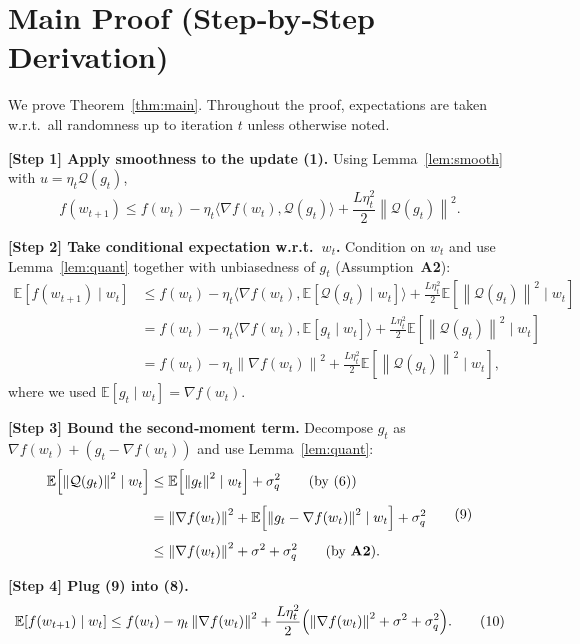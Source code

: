 \documentclass{article}
\newcommand{\E}{\mathbb{E}}
\newcommand{\norm}[1]{\left\lVert #1\right\rVert}
\newcommand{\Qop}{\mathcal{Q}}
\begin{document}
\section*{Main Proof (Step‑by‑Step Derivation)}
We prove Theorem~\ref{thm:main}.  Throughout the proof, expectations are taken w.r.t.\ all randomness up to iteration $t$ unless otherwise noted.

\bigskip
\noindent\textbf{[Step 1] Apply smoothness to the update (1).}  
Using Lemma~\ref{lem:smooth} with $u=\eta_t\Qop(g_t)$,
\[
f(w_{t+1})\le f(w_t)-\eta_t\langle\nabla f(w_t),\Qop(g_t)\rangle
+\frac{L\eta_t^{2}}{2}\norm{\Qop(g_t)}^{2}. \tag{7}
\]

\bigskip
\noindent\textbf{[Step 2] Take conditional expectation w.r.t.\ $w_t$.}  
Condition on $w_t$ and use Lemma~\ref{lem:quant} together with unbiasedness of $g_t$ (Assumption~\textbf{A2}):
\[
\begin{aligned}
\E\!\left[f(w_{t+1})\mid w_t\right]
&\le f(w_t)-\eta_t\langle\nabla f(w_t),\E[\Qop(g_t)\mid w_t]\rangle
+\frac{L\eta_t^{2}}{2}\E\!\left[\norm{\Qop(g_t)}^{2}\mid w_t\right]\\[4pt]
&= f(w_t)-\eta_t\langle\nabla f(w_t),\E[g_t\mid w_t]\rangle
+\frac{L\eta_t^{2}}{2}\E\!\left[\norm{\Qop(g_t)}^{2}\mid w_t\right] \\[4pt]
&= f(w_t)-\eta_t\norm{\nabla f(w_t)}^{2}
+\frac{L\eta_t^{2}}{2}\E\!\left[\norm{\Qop(g_t)}^{2}\mid w_t\right],
\end{aligned}
\tag{8}
\]
where we used $\E[g_t\mid w_t]=\nabla f(w_t)$.

\bigskip
\noindent\textbf{[Step 3] Bound the second‑moment term.}  
Decompose $g_t$ as $\nabla f(w_t)+(g_t-\nabla f(w_t))$ and use Lemma~\ref{lem:quant}:
\[
\begin{aligned}
\E\!\left[\norm{\Qop(g_t)}^{2}\mid w_t\right]
&\le \E\!\left[\norm{g_t}^{2}\mid w_t\right]+\sigma_q^{2} \qquad\text{(by (6))}\\[4pt]
&= \norm{\nabla f(w_t)}^{2}
   +\E\!\left[\norm{g_t-\nabla f(w_t)}^{2}\mid w_t\right]
   +\sigma_q^{2} \\[4pt]
&\le \norm{\nabla f(w_t)}^{2} + \sigma^{2} + \sigma_q^{2}
\qquad\text{(by \textbf{A2})}.
\end{aligned}
\tag{9}
\]

\bigskip
\noindent\textbf{[Step 4] Plug (9) into (8).}
\[
\E\!\left[f(w_{t+1})\mid w_t\right]
\le f(w_t)-\eta_t\norm{\nabla f(w_t)}^{2}
+\frac{L\eta_t^{2}}{2}\Bigl(\norm{\nabla f(w_t)}^{2}+\sigma^{2}+\sigma_q^{2}\Bigr).
\tag{10}
\]
\end{document}
